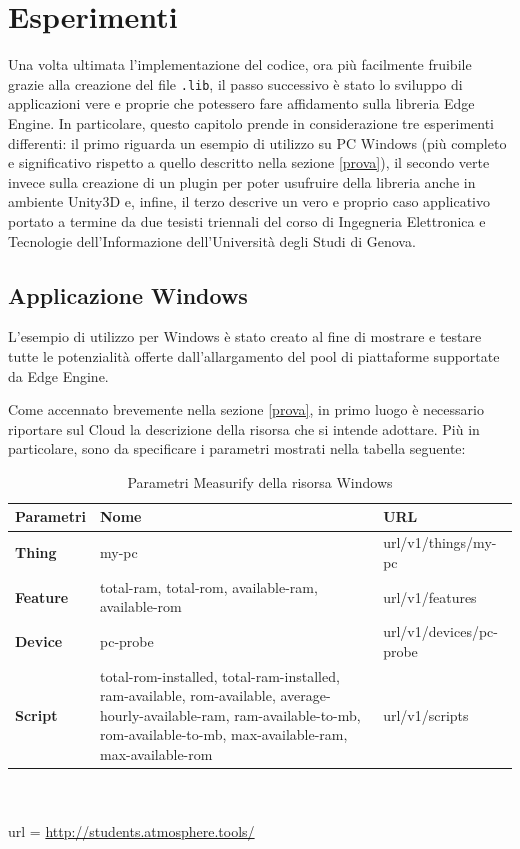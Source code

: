 \chapter{Esperimenti}
Una volta ultimata l’implementazione del codice, ora più facilmente fruibile grazie alla creazione del file \texttt{.lib}, il passo successivo è stato lo sviluppo di applicazioni vere e proprie che potessero fare affidamento sulla libreria Edge Engine. In particolare, questo capitolo prende in considerazione tre esperimenti differenti: il primo riguarda un esempio di utilizzo su PC Windows (più completo e significativo rispetto a quello descritto nella sezione \ref{prova}), il secondo verte invece sulla creazione di un plugin per poter usufruire della libreria anche in ambiente Unity3D e, infine, il terzo descrive un vero e proprio caso applicativo portato a termine da due tesisti triennali del corso di Ingegneria Elettronica e Tecnologie dell'Informazione dell'Università degli Studi di Genova.
\section{Applicazione Windows}
L'esempio di utilizzo per Windows è stato creato al fine di mostrare e testare tutte le potenzialità offerte dall'allargamento del pool di piattaforme supportate da Edge Engine.

Come accennato brevemente nella sezione \ref{prova}, in primo luogo è necessario riportare sul Cloud la descrizione della risorsa che si intende adottare. Più in particolare, sono da specificare i parametri mostrati nella tabella seguente:

\begin{table}[H]
	\begin{tabular}{|p{}|p{}|p{}|}
		\hline
		\textbf{Parametri} & \textbf{Nome} & \textbf{URL}\\
		\hline
		\textbf{Thing} & my-pc & {{url}}/v1/things/my-pc\\
		\hline
		\textbf{Feature} & total-ram, total-rom, available-ram, available-rom & {{url}}/v1/features\\
		\hline
		\textbf{Device} & pc-probe & {{url}}/v1/devices/pc-probe\\	
		\hline
		\textbf{Script} & total-rom-installed, total-ram-installed, ram-available, rom-available, average-hourly-available-ram, ram-available-to-mb, rom-available-to-mb,  max-available-ram, max-available-rom & {{url}}/v1/scripts\\	
		\hline
	\end{tabular}
\\\\url = \url{http://students.atmosphere.tools/}
	\caption{Parametri Measurify della risorsa Windows}
	\label{paramMeas}
\end{table}

